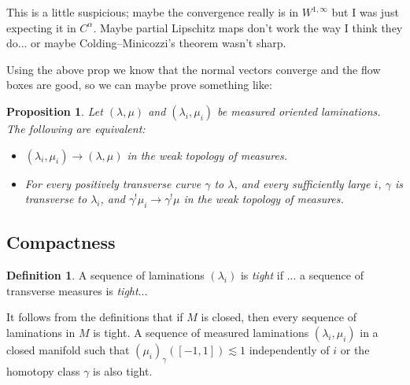 \documentclass[reqno,10pt]{amsart}
\newcommand{\dfn}[1]{\emph{#1}\index{#1}}
\newtheorem{proposition}[theorem]{Proposition}
\theoremstyle{definition}
\newtheorem{definition}[theorem]{Definition}
\numberwithin{equation}{section}
\begin{document}
This is a little suspicious; maybe the convergence really is in $W^{1, \infty}$ but I was just expecting it in $C^\alpha$. 
Maybe partial Lipschitz maps don't work the way I think they do... or maybe Colding--Minicozzi's theorem wasn't sharp.

Using the above prop we know that the normal vectors converge and the flow boxes are good, so we can maybe prove something like:

\begin{proposition}\label{measured implies transversality}
Let $(\lambda, \mu)$ and $(\lambda_i, \mu_i)$ be measured oriented laminations. The following are equivalent:
\begin{itemize}
\item $(\lambda_i, \mu_i) \to (\lambda, \mu)$ in the weak topology of measures.
\item For every positively transverse curve $\gamma$ to $\lambda$, and every sufficiently large $i$, $\gamma$ is transverse to $\lambda_i$, and $\gamma^! \mu_i \to \gamma^! \mu$ in the weak topology of measures.
\end{itemize}
\end{proposition}

\subsection{Compactness}
\begin{definition}
A sequence of laminations $(\lambda_i)$ is \dfn{tight} if ... a sequence of transverse measures is \dfn{tight}...
\end{definition}

It follows from the definitions that if $M$ is closed, then every sequence of laminations in $M$ is tight.
A sequence of measured laminations $(\lambda_i, \mu_i)$ in a closed manifold such that $(\mu_i)_\gamma([-1, 1]) \lesssim 1$ independently of $i$ or the homotopy class $\gamma$ is also tight.
\end{document}
